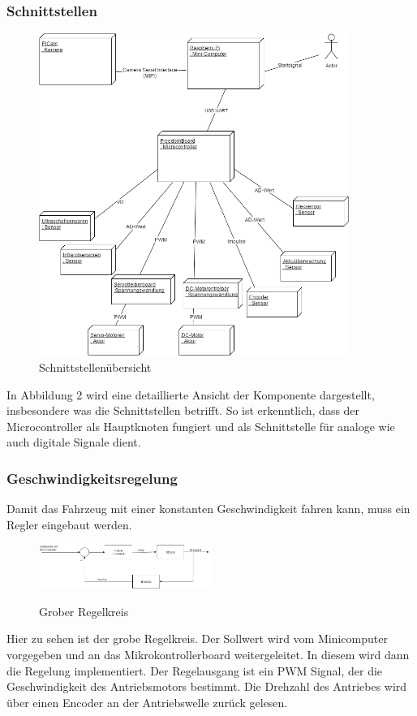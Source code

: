 \subsubsection{Schnittstellen}
\begin{figure}[h!]%
\centering
\includegraphics[width=0.9\textwidth]{03_Loesungskonzept/pictures/Verteilungsdiagramm.png}
\caption{Schnittstellenübersicht}
\label{fig:Java}
\end{figure}
In Abbildung 2 wird eine detaillierte Ansicht der Komponente dargestellt, insbesondere was die Schnittstellen betrifft. So ist erkenntlich, dass der Microcontroller als Hauptknoten fungiert und als Schnittstelle für analoge wie auch digitale Signale dient.
\subsubsection{Geschwindigkeitsregelung}
Damit das Fahrzeug mit einer konstanten Geschwindigkeit fahren kann, muss ein Regler eingebaut werden.
\begin{figure}[H]
	\centering
	\includegraphics[width=0.5\textwidth]{03_Loesungskonzept/pictures/Gesch_Regelung.png}
	\label{fig:Regelung_Gesch}
	\caption{Grober Regelkreis}
\end{figure}
Hier zu sehen ist der grobe Regelkreis. Der Sollwert wird vom Minicomputer vorgegeben und an das Mikrokontrollerboard weitergeleitet. In diesem wird dann die Regelung implementiert. Der Regelausgang ist ein PWM Signal, der die Geschwindigkeit des Antriebsmotors bestimmt. Die Drehzahl des Antriebes wird über einen Encoder an der Antriebswelle zurück gelesen.
